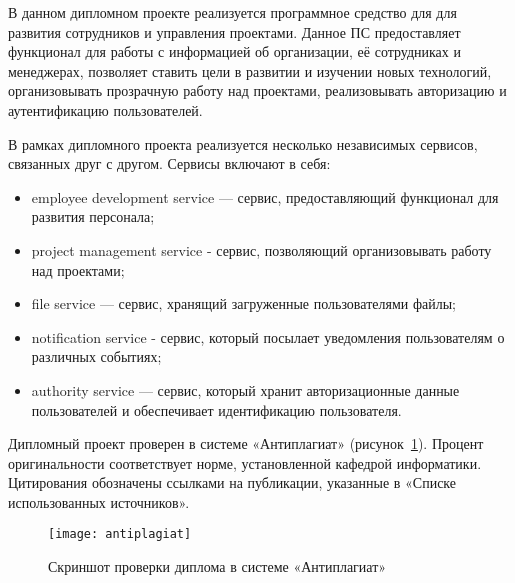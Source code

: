 В данном дипломном проекте реализуется программное средство для для развития сотрудников и управления проектами. Данное ПС предоставляет функционал для работы с информацией об организации, её сотрудниках и менеджерах, позволяет ставить цели в развитии и изучении новых технологий, организовывать прозрачную работу над проектами, реализовывать авторизацию и аутентификацию пользователей.

В рамках дипломного проекта реализуется несколько независимых сервисов, связанных друг с другом. Сервисы включают в себя:
\begin{itemize}
    \item employee development service — сервис, предоставляющий функционал для развития персонала;
    \item project management service - сервис, позволяющий организовывать работу над проектами;
    \item file service — сервис, хранящий загруженные пользователями файлы;
    \item notification service - сервис, который посылает уведомления пользователям о различных событиях;
    \item authority service — сервис, который хранит авторизационные данные пользователей и обеспечивает идентификацию пользователя.
\end{itemize}

Дипломный проект проверен в системе «Антиплагиат» (рисунок~\ref{fig:antiplagiat}). Процент оригинальности соответствует норме, установленной кафедрой информатики. Цитирования обозначены ссылками на публикации, указанные в «Списке использованных источников».

\begin{figure}[ht]
    \centering
    \texttt{[image: antiplagiat]}
    \renewcommand{\thefigure}{1}
    \caption{Скриншот проверки диплома в системе «Антиплагиат»}\label{fig:antiplagiat}
\end{figure}